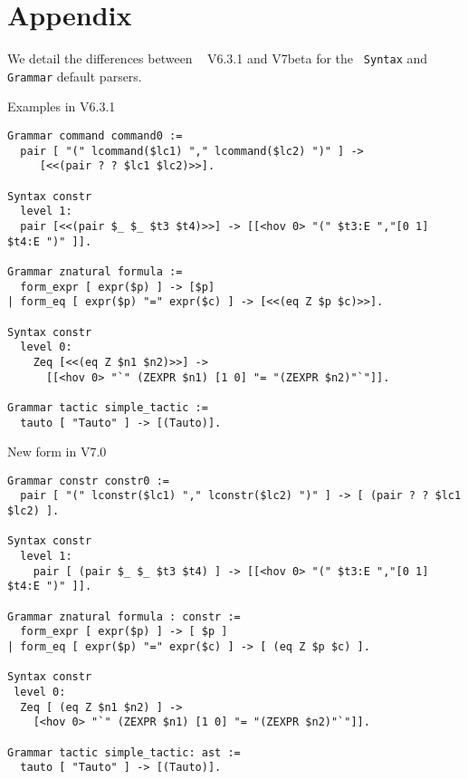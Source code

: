 \documentclass[11pt]{article}
\begin{document}
%

%
%

\section*{Appendix}
\label{Appendix}
We detail the differences between \Coq~ V6.3.1 and V7beta for the {\tt
Syntax} and {\tt Grammar} default parsers.

\medskip

Examples in V6.3.1

\begin{verbatim}
Grammar command command0 :=
  pair [ "(" lcommand($lc1) "," lcommand($lc2) ")" ] ->
	 [<<(pair ? ? $lc1 $lc2)>>].

Syntax constr
  level 1:
  pair [<<(pair $_ $_ $t3 $t4)>>] -> [[<hov 0> "(" $t3:E ","[0 1] $t4:E ")" ]].

Grammar znatural formula :=
  form_expr [ expr($p) ] -> [$p]
| form_eq [ expr($p) "=" expr($c) ] -> [<<(eq Z $p $c)>>].

Syntax constr
  level 0:
    Zeq [<<(eq Z $n1 $n2)>>] -> 
      [[<hov 0> "`" (ZEXPR $n1) [1 0] "= "(ZEXPR $n2)"`"]].

Grammar tactic simple_tactic :=
  tauto [ "Tauto" ] -> [(Tauto)].
\end{verbatim}

New form in V7.0

\begin{verbatim}
Grammar constr constr0 :=
  pair [ "(" lconstr($lc1) "," lconstr($lc2) ")" ] -> [ (pair ? ? $lc1 $lc2) ].

Syntax constr
  level 1:
    pair [ (pair $_ $_ $t3 $t4) ] -> [[<hov 0> "(" $t3:E ","[0 1] $t4:E ")" ]].

Grammar znatural formula : constr :=
  form_expr [ expr($p) ] -> [ $p ]
| form_eq [ expr($p) "=" expr($c) ] -> [ (eq Z $p $c) ].

Syntax constr
 level 0:
  Zeq [ (eq Z $n1 $n2) ] -> 
    [<hov 0> "`" (ZEXPR $n1) [1 0] "= "(ZEXPR $n2)"`"]].

Grammar tactic simple_tactic: ast :=
  tauto [ "Tauto" ] -> [(Tauto)].
\end{verbatim}
\end{document}
